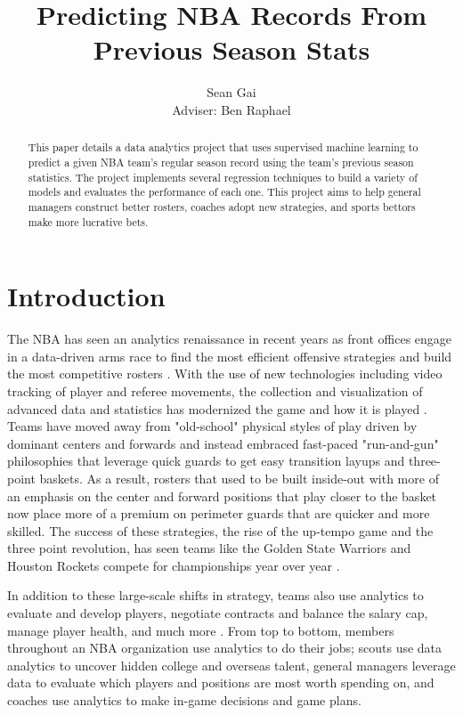 \documentclass[pageno]{jpaper}
\begin{document}
\title{Predicting NBA Records From Previous Season Stats}

\author{Sean Gai\\Adviser: Ben Raphael}

\date{}
\maketitle

\thispagestyle{empty}
\doublespacing
\begin{abstract}
This paper details a data analytics project that uses supervised machine learning to predict a given NBA team's regular season record using the team's previous season statistics. The project implements several regression techniques to build a variety of models and evaluates the performance of each one. This project aims to help general managers construct better rosters, coaches adopt new strategies, and sports bettors make more lucrative bets.
\end{abstract}

\section{Introduction}

The NBA has seen an analytics renaissance in recent years as front offices 
engage in a data-driven arms race to find the most efficient offensive strategies and build the most competitive rosters \cite{abbas}. With the use of new technologies including video tracking of player and referee movements, the collection and visualization of advanced data and statistics has modernized the game and how it is played \cite{nbastuffer}. Teams have moved away from "old-school" physical styles of play driven by dominant centers and forwards and instead embraced fast-paced "run-and-gun" philosophies that leverage quick guards to get easy transition layups and three-point baskets. As a result, rosters that used to be built inside-out with more of an emphasis on the center and forward positions that play closer to the basket now place more of a premium on perimeter guards that are quicker and more skilled. The success of these strategies, the rise of the up-tempo game and the three point revolution, has seen teams like the Golden State Warriors and Houston Rockets compete for championships year over year \cite{atlanticsmarter}.

In addition to these large-scale shifts in strategy, teams also use analytics to evaluate and develop players, negotiate contracts and balance the salary cap, manage player health, and much more \cite{nbastuffer}. From top to bottom, members throughout an NBA organization use analytics to do their jobs; scouts use data analytics to uncover hidden college and overseas talent, general managers leverage data to evaluate which players and positions are most worth spending on, and coaches use analytics to make in-game decisions and game plans.
\end{document}
